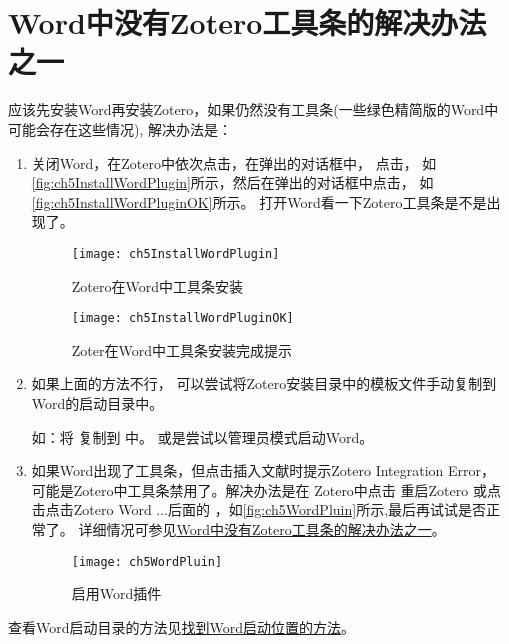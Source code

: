\documentclass[cn,11pt,chinese]{elegantbook}
\begin{document}
    	\section{Word中没有Zotero工具条的解决办法之一}\label{sec:tool_bar}
	    	应该先安装Word再安装Zotero，如果仍然没有工具条(一些绿色精简版的Word中可能会存在这些情况),	    	
			解决办法是：
			\begin{enumerate}
				\item 关闭Word，在Zotero中依次点击，在弹出的对话框中，
				点击，
				如\autoref{fig:ch5InstallWordPlugin}所示，然后在弹出的对话框中点击，
				如\autoref{fig:ch5InstallWordPluginOK}所示。
				打开Word看一下Zotero工具条是不是出现了。
			 
						\begin{figure}[htbp]
							\centering
							\texttt{[image: ch5InstallWordPlugin]}
							\caption{Zotero在Word中工具条安装}
							\label{fig:ch5InstallWordPlugin}
							\end{figure}
						
						\begin{figure}[htbp]
							\centering
							\texttt{[image: ch5InstallWordPluginOK]}
							\caption{Zoter在Word中工具条安装完成提示}
							\label{fig:ch5InstallWordPluginOK}
							\end{figure}
				\item 如果上面的方法不行，
			可以尝试将Zotero安装目录中的模板文件手动复制到Word的启动目录中。
	    	
			如：将
			复制到 
			中。
			或是尝试以管理员模式启动Word。
	    		
			   \item 如果Word出现了工具条，但点击插入文献时提示Zotero Integration Error，
			   可能是Zotero中工具条禁用了。解决办法是在
			   Zotero中点击 重启Zotero
			   或点击点击Zotero Word ...后面的 
			   ，如\autoref{fig:ch5WordPluin}所示,最后再试试是否正常了。
			   详细情况可参见\href{https://zhuanlan.zhihu.com/p/58931999}
			   {Word中没有Zotero工具条的解决办法之一}。
		    		\begin{figure}[htbp]
		    				\centering
		    				\texttt{[image: ch5WordPluin]}
		    				\caption{启用Word插件}
		    				\label{fig:ch5WordPluin}
		    		\end{figure}	
			\end{enumerate}
				查看Word启动目录的方法见\href{https://zhuanlan.zhihu.com/p/85513418}
				{找到Word启动位置的方法}。
		
\end{document}
